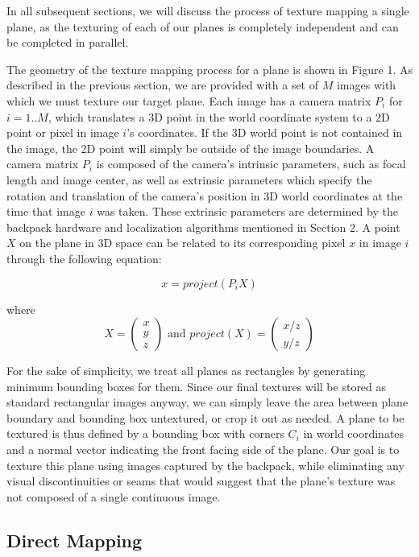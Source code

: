 \documentclass[10pt,twocolumn,letterpaper]{article}
\begin{document}
In all subsequent sections, we will discuss the process of texture
mapping a single plane, as the texturing of each of our planes is
completely independent and can be completed in parallel.

The geometry of the texture mapping process for a plane is shown in
Figure 1.  As described in the previous section, we are provided with
a set of $M$ images with which we must texture our target plane. Each
image has a camera matrix $P_i$ for $i=1..M$, which translates a 3D
point in the world coordinate system to a 2D point or pixel in image
$i$'s coordinates. If the 3D world point is not contained in the
image, the 2D point will simply be outside of the image boundaries. A
camera matrix $P_i$ is composed of the camera's intrinsic parameters,
such as focal length and image center, as well as extrinsic parameters
which specify the rotation and translation of the camera's position in
3D world coordinates at the time that image $i$ was taken. These
extrinsic parameters are determined by the backpack hardware and
localization algorithms mentioned in Section 2. A point $X$ on the
plane in 3D space can be related to its corresponding pixel $x$ in
image $i$ through the following equation:

\[
x=project(P_iX)
\]

where
\[X = \begin{pmatrix} x \\ y \\ z \end{pmatrix} \textrm{ and }
project(X) = \begin{pmatrix} x/z \\ y/z \end{pmatrix}
\]

For the sake of simplicity, we treat all planes as rectangles by
generating minimum bounding boxes for them. Since our final textures
will be stored as standard rectangular images anyway, we can simply
leave the area between plane boundary and bounding box untextured, or
crop it out as needed. A plane to be textured is thus defined by a
bounding box with corners $C_i$ in world coordinates and a normal
vector indicating the front facing side of the plane. Our goal is to
texture this plane using images captured by the backpack, while
eliminating any visual discontinuities or seams that would suggest
that the plane's texture was not composed of a single continuous
image.



\subsection{Direct Mapping}
\end{document}
